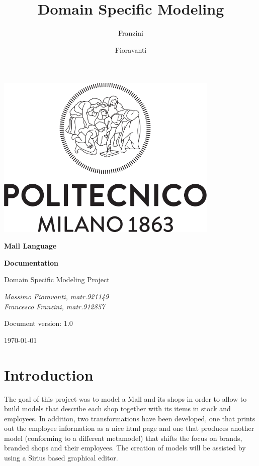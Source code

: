 \documentclass[a4paper]{article}
\author{Franzini \and Fioravanti}
\title{Domain Specific Modeling}
\begin{document}
	
\begin{titlepage}
	\centering
	\includegraphics[width=0.80\textwidth]{pictures/Logo_Politecnico_Milano}\par
	\vspace{1.5cm}
	{\LARGE \textbf {Mall Language} \par}
	\vspace{0.3cm}
	{\large \textbf{Documentation} \par}
	\vspace{1.5cm}
	{\Large{Domain Specific Modeling Project} \par}
	\vspace{1.5cm}
	{\Large\itshape Massimo Fioravanti, matr.921149 \\
				    Francesco Franzini, matr.912857 \\ }
	\vspace{2cm}
	\vfill
	{\large Document version: 1.0\par}
	{\large \today \par}
\end{titlepage}	
	
\maketitle
\tableofcontents
\clearpage

\section{Introduction}
The goal of this project was to model a Mall and its shops in order to allow to build models that describe each shop together with its items in stock and employees. In addition, two transformations have been developed, one that prints out the employee information as a nice html page and one that produces another model (conforming to a different metamodel) that shifts the focus on brands, branded shops and their employees. The creation of models will be assisted by using a Sirius based graphical editor.
\end{document}
